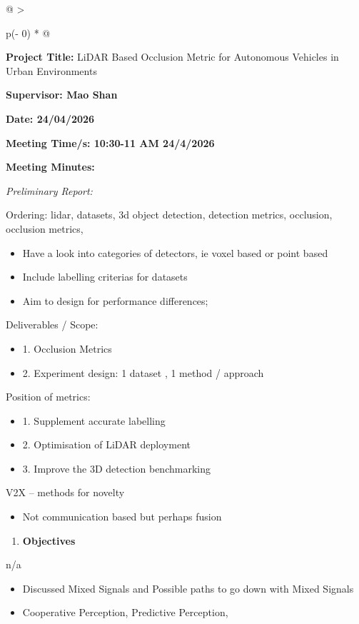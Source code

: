 \begin{longtable}[]{@{}
  >{\raggedright\arraybackslash}p{(\columnwidth - 0\tabcolsep) * }@{}}
\begin{minipage}[t]{\linewidth}
\textbf{Project Title:} LiDAR Based Occlusion Metric for Autonomous
Vehicles in Urban Environments

\textbf{Supervisor: Mao Shan}

\textbf{Date: 24/04/2026}

\textbf{Meeting Time/s: 10:30-11 AM 24/4/2026}

\textbf{Meeting Minutes:}

\emph{Preliminary Report:}

Ordering: lidar, datasets, 3d object detection, detection metrics,
occlusion, occlusion metrics,

\begin{itemize}
\item
  Have a look into categories of detectors, ie voxel based or point
  based
\item
  Include labelling criterias for datasets
\item
  Aim to design for performance differences;
\end{itemize}

Deliverables / Scope:

\begin{itemize}
\item
  1. Occlusion Metrics
\item
  2. Experiment design: 1 dataset , 1 method / approach
\end{itemize}

Position of metrics:

\begin{itemize}
\item
  1. Supplement accurate labelling
\item
  2. Optimisation of LiDAR deployment
\item
  3. Improve the 3D detection benchmarking
\end{itemize}

V2X -- methods for novelty

\begin{itemize}
\item
  Not communication based but perhaps fusion
\end{itemize}

\begin{enumerate}
\def\labelenumi{\arabic{enumi}.}
\setcounter{enumi}{7}
\item
  \textbf{Objectives}
\end{enumerate}

n/a

\begin{itemize}
\item
  Discussed Mixed Signals and Possible paths to go down with Mixed
  Signals
\item
  Cooperative Perception, Predictive Perception,
\end{itemize}


\end{minipage}
\end{longtable}
